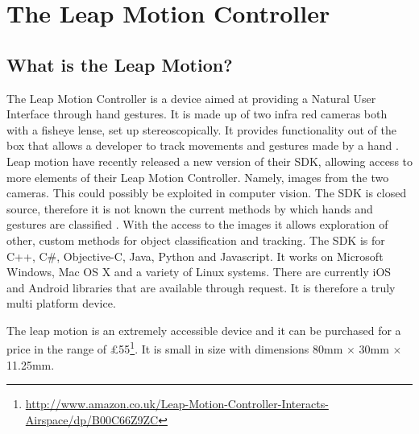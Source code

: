 \documentclass[11pt,oneside]{report}
\begin{document}
		\section{The Leap Motion Controller}
			\subsection{What is the Leap Motion?}
				The Leap Motion Controller is a device aimed at providing a Natural User Interface through hand gestures.
				It is made up of two infra red cameras both with a fisheye lense, set up stereoscopically. %
				It provides functionality out of the box that allows a developer to track movements and gestures made by a hand \cite{web:leapGestures}.
				Leap motion have recently released a new version of their SDK, allowing access to more elements of their Leap Motion Controller. 
				Namely, images from the two cameras. 
				This could possibly be exploited in computer vision. %
				The  SDK is closed source, therefore it is not known the current methods by which hands and gestures are classified \cite[p. 217]{journal:leapEvaluation}.
				With the access to the images it allows exploration of other, custom methods for object classification and tracking.
				The SDK is for C++, C\#, Objective-C, Java, Python and Javascript.
				It works on Microsoft Windows, Mac OS X and a variety of Linux systems.
				There are currently iOS and Android libraries that are available through request.
				It is therefore a truly multi platform device.
				
				The leap motion is an extremely accessible device and it can be purchased for a price in the range of \pounds55\footnote{\url{http://www.amazon.co.uk/Leap-Motion-Controller-Interacts-Airspace/dp/B00C66Z9ZC}}.
				It is small in size with dimensions 80mm $\times$ 30mm $\times$ 11.25mm.
				
				
				
\end{document}
